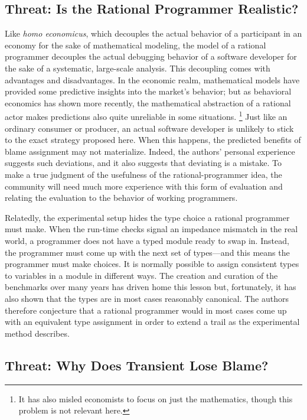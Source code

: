 \subsection{Threat: Is the Rational Programmer Realistic?}

Like {\em homo economicus\/}, which decouples the actual behavior of a
participant in an economy for the sake of mathematical modeling, the model of a
rational programmer decouples the actual debugging behavior of a software
developer for the sake of a systematic, large-scale analysis. This decoupling
comes with advantages and disadvantages. In the economic realm, mathematical models
have provided some predictive insights into the market's behavior; but as
behavioral economics has shown more recently, the mathematical abstraction of a
rational actor makes predictions also quite unreliable in some situations.
\footnote{It has also misled economists to focus on just the mathematics, though
this problem is not relevant here.}  Just like an ordinary consumer or producer,
an actual software developer is unlikely to stick to the exact strategy proposed
here. When this happens, the predicted benefits of blame assignment may not
materialize. Indeed, the authors' personal experience suggests such deviations, and
it also suggests that deviating is a mistake. To make a true judgment of the
usefulness of the rational-programmer idea, the community will need much more
experience with this form of evaluation and relating the evaluation to the
behavior of working programmers.

Relatedly, the experimental setup hides the type choice a rational programmer must make. When the
run-time checks signal an impedance mismatch in the real world, a programmer
does not have a typed module ready to swap in. Instead, the programmer must
come up with the next set of types---and this means the programmer must make
choices. It is normally possible to assign consistent types to variables in a
module in different ways. The creation and curation of the benchmarks over
many years has driven home this lesson but, fortunately, it has also shown that
the types are in most cases reasonably canonical.  The authors therefore conjecture that
a rational programmer would in most cases come up with an equivalent type
assignment in order to extend a trail as the experimental method describes.

\subsection{Threat: Why Does Transient Lose Blame?} \label{sec:threat:transient}

